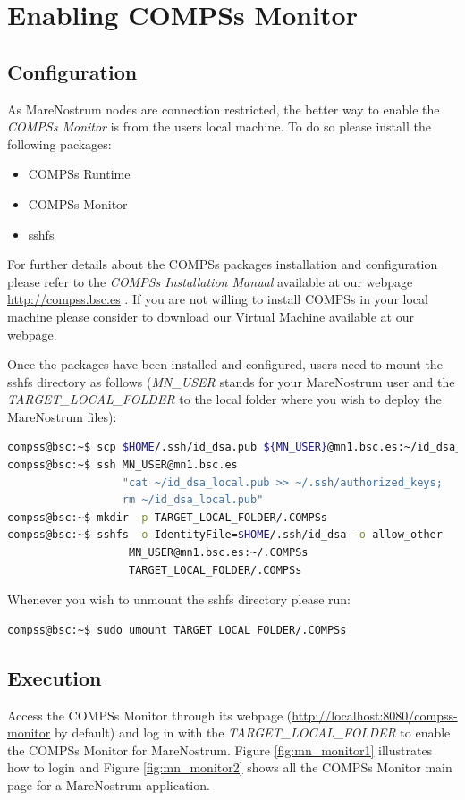\section{Enabling COMPSs Monitor}
\label{sec:Monitor}


\subsection{Configuration}
As MareNostrum nodes are connection restricted, the better way to enable the \textit{COMPSs Monitor} is from the users local machine. 
To do so please install the following packages:
\begin{itemize}
 \item COMPSs Runtime
 \item COMPSs Monitor
 \item sshfs
\end{itemize}

For further details about the COMPSs packages installation and configuration please refer to the \textit{COMPSs Installation Manual} 
available at our webpage \url{http://compss.bsc.es} . If you are not willing to install COMPSs in your local machine please consider
to download our Virtual Machine available at our webpage. 
\newline

Once the packages have been installed and configured, users need to mount the sshfs directory as follows (\textit{MN\_USER} stands for 
your MareNostrum user and the \textit{TARGET\_LOCAL\_FOLDER} to the local folder where you wish to deploy the MareNostrum files):
\begin{lstlisting}[language=bash]
compss@bsc:~$ scp $HOME/.ssh/id_dsa.pub ${MN_USER}@mn1.bsc.es:~/id_dsa_local.pub
compss@bsc:~$ ssh MN_USER@mn1.bsc.es 
                  "cat ~/id_dsa_local.pub >> ~/.ssh/authorized_keys; 
                  rm ~/id_dsa_local.pub"
compss@bsc:~$ mkdir -p TARGET_LOCAL_FOLDER/.COMPSs
compss@bsc:~$ sshfs -o IdentityFile=$HOME/.ssh/id_dsa -o allow_other 
                   MN_USER@mn1.bsc.es:~/.COMPSs 
                   TARGET_LOCAL_FOLDER/.COMPSs
\end{lstlisting}

Whenever you wish to unmount the sshfs directory please run:
\begin{lstlisting}[language=bash]
compss@bsc:~$ sudo umount TARGET_LOCAL_FOLDER/.COMPSs
\end{lstlisting}


\subsection{Execution}
Access the COMPSs Monitor through its webpage (\url{http://localhost:8080/compss-monitor} by default) and log in with the 
\textit{TARGET\_LOCAL\_FOLDER} to enable the COMPSs Monitor for MareNostrum. Figure \ref{fig:mn_monitor1} illustrates how to
login and Figure \ref{fig:mn_monitor2} shows all the COMPSs Monitor main page for a MareNostrum application. 
\newpage

